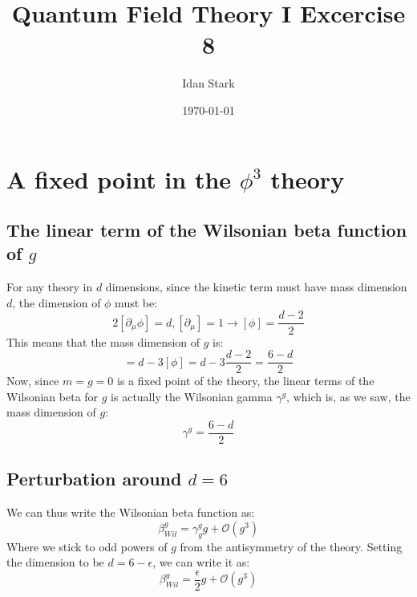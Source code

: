 \documentclass{article}
\title{Quantum Field Theory I Excercise 8}
\author{Idan Stark}
\date{\today}
\begin{document}
\maketitle

\section{A fixed point in the $\phi^3$ theory}
\subsection{The linear term of the Wilsonian beta function of $g$}
For any theory in $d$ dimensions, since the kinetic term must have mass dimension $d$, the dimension of $\phi$ must be:
\begin{equation}
    2[\partial_\mu\phi] = d, [\partial_\mu] = 1 \rightarrow [\phi] = \frac{d - 2}{2}
\end{equation}
This means that the mass dimension of $g$ is:
\begin{equation}
    [g] = d - 3[\phi] = d - 3\frac{d - 2}{2} = \frac{6 - d}{2}
\end{equation}
Now, since $m = g = 0$ is a fixed point of the theory, the linear terms of the Wilsonian beta for $g$ is actually the Wilsonian gamma $\gamma^g$, which is, as we saw, the mass dimension of $g$:
\begin{equation}
    \gamma^g = \frac{6 - d}{2}
\end{equation}
\subsection{Perturbation around $d = 6$}
We can thus write the Wilsonian beta function as:
\begin{equation}
    \beta_{Wil}^g = \gamma^g_g g + \mathcal{O}(g^3)
\end{equation}
Where we stick to odd powers of $g$ from the antisymmetry of the theory. Setting the dimension to be $d = 6 - \epsilon$, we can write it as:
\begin{equation}
    \beta_{Wil}^g = \frac{\epsilon}{2} g + \mathcal{O}(g^3)
\end{equation}
\end{document}
